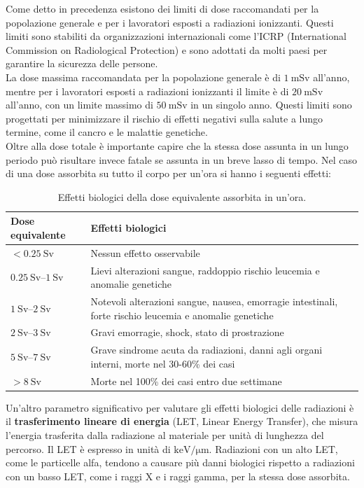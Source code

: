 Come detto in precedenza esistono dei limiti di dose raccomandati per la popolazione generale e per i lavoratori esposti a radiazioni ionizzanti. Questi limiti sono stabiliti da organizzazioni internazionali come l'ICRP (International Commission on Radiological Protection) e sono adottati da molti paesi per garantire la sicurezza delle persone.\\
La dose massima raccomandata per la popolazione generale è di $\qty{1}{\milli\sievert}$ all'anno, mentre per i lavoratori esposti a radiazioni ionizzanti il limite è di $\qty{20}{\milli\sievert}$ all'anno, con un limite massimo di $\qty{50}{\milli\sievert}$ in un singolo anno. Questi limiti sono progettati per minimizzare il rischio di effetti negativi sulla salute a lungo termine, come il cancro e le malattie genetiche.\\
Oltre alla dose totale è importante capire che la stessa dose assunta in un lungo periodo può risultare invece fatale se assunta in un breve lasso di tempo. Nel caso di una dose assorbita su tutto il corpo per un'ora si hanno i seguenti effetti:
\begin{table}
    \centering
    \begin{tabular}{p{5cm}p{8cm}}
        \hline
        \textbf{Dose equivalente} & \textbf{Effetti biologici} \\
        \hline
        $<\qty{0.25}{\sievert}$ & Nessun effetto osservabile \\[8pt]
        $\qtyrange{0.25}{1}{\sievert}$ & Lievi alterazioni sangue, raddoppio rischio leucemia e anomalie genetiche \\[8pt]
        $\qtyrange{1}{2}{\sievert}$ & Notevoli alterazioni sangue, nausea, emorragie intestinali, forte rischio leucemia e anomalie genetiche \\[8pt]
        $\qtyrange{2}{3}{\sievert}$ & Gravi emorragie, shock, stato di prostrazione \\[8pt]
        $\qtyrange{5}{7}{\sievert}$ & Grave sindrome acuta da radiazioni, danni agli organi interni, morte nel 30-60\% dei casi \\[8pt]
        $>\qty{8}{\sievert}$ & Morte nel 100\% dei casi entro due settimane \\
        \hline
    \end{tabular}
    \caption{Effetti biologici della dose equivalente assorbita in un'ora.}
    \label{tab:biological_effects_radiation}
\end{table}
Un'altro parametro significativo per valutare gli effetti biologici delle radiazioni è il \textbf{trasferimento lineare di energia} (LET, Linear Energy Transfer), che misura l'energia trasferita dalla radiazione al materiale per unità di lunghezza del percorso. Il LET è espresso in unità di $\si{\kilo\electronvolt\per\micro\meter}$. Radiazioni con un alto LET, come le particelle alfa, tendono a causare più danni biologici rispetto a radiazioni con un basso LET, come i raggi X e i raggi gamma, per la stessa dose assorbita.\\
